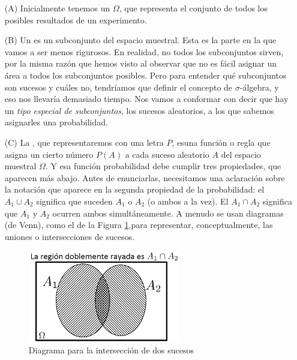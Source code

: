     \begin{itemize}
        \item[(A)] Inicialmente tenemos un  $\Omega$, que representa el conjunto de todos los posibles resultados de un experimento.
        \item[(B)] Un  es un subconjunto del espacio muestral. Esta es la parte en la que vamos a ser menos rigurosos. En realidad, no todos los subconjuntos sirven, por la misma razón que hemos visto al observar que no es fácil asignar un área a todos los subconjuntos posibles. Pero para entender qué subconjuntos son sucesos y cuáles no, tendríamos que definir el concepto de $\sigma$-álgebra, y eso nos llevaría demasiado tiempo. Nos vamos a conformar con decir que hay un {\em tipo especial de subconjuntos}, los sucesos aleatorios, a los que sabemos asignarles una probabilidad.
        \item[(C)] La , que representaremos con una letra $P$,  esuna función o regla que  asigna un cierto número $P(A)$ a cada suceso aleatorio $A$ del espacio muestral $\Omega$. Y esa función probabilidad debe cumplir  tres propiedades, que aparecen más abajo. Antes de enunciarlas, necesitamos una aclaración sobre la notación que aparece en la segunda propiedad  de la probabilidad: el  $A_1\cup A_2$ significa que suceden $A_1$ o $A_2$ (o ambos a la vez). El  $A_1\cap A_2$ significa que $A_1$ y $A_2$ ocurren ambos simultáneamente. A menudo se usan diagramas (de Venn), como el de la Figura \ref{Cap03:fig:DiagramaVennInterseccionSucesos},para representar, conceptualmente, las uniones o intersecciones de sucesos.

\begin{figure}[htbp]
\begin{center}
\includegraphics[height=4cm]{../fig/Cap03-DiagramaVennInterseccionSucesos.png}
	\caption{Diagrama para la intersección de dos sucesos }\label{Cap03:fig:DiagramaVennInterseccionSucesos}
\end{center}
\end{figure}


\end{itemize}
